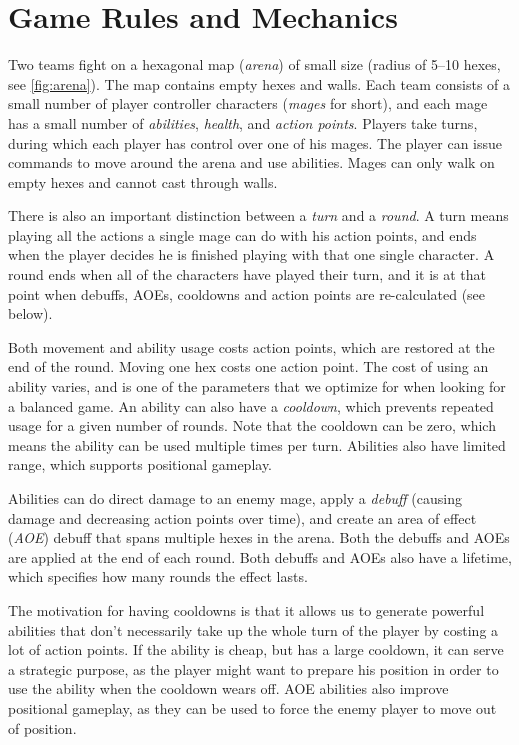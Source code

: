 \chapter{Game Rules and Mechanics}
\label{chapter02}

Two teams fight on a hexagonal map (\emph{arena}) of small size (radius of
5--10 hexes, see \autoref{fig:arena}). The map contains empty hexes and walls.
Each team consists of a small number of player controller
characters (\emph{mages} for short), and each mage has a small number of
\emph{abilities}, \emph{health}, and \emph{action points}. Players take turns, during
which each player has control over one of his mages. The player can issue
commands to move around the arena and use abilities. Mages can only walk on empty hexes
and cannot cast through walls.

There is also an important distinction between a \emph{turn} and a \emph{round}.
A turn means playing all the actions a single mage can do with his action points,
and ends when the player decides he is finished playing with that one single character.
A round ends when all of the characters have played their turn, and it is at that point
when debuffs, AOEs, cooldowns and action points are re-calculated (see below).

Both movement and ability usage costs action points, which are restored at the
end of the round. Moving one hex costs one action point. The cost of using an
ability varies, and is one of the parameters that we optimize for when looking
for a balanced game. An ability can also have a \emph{cooldown}, which
prevents repeated usage for a given number of rounds. Note that the cooldown
can be zero, which means the ability can be used multiple times per turn.
Abilities also have limited range, which supports positional gameplay.

Abilities can do direct damage to an enemy mage, apply a \emph{debuff} (causing
damage and decreasing action points over time), and create an area of effect
(\emph{AOE}) debuff that spans multiple hexes in the arena. Both the debuffs and
AOEs are applied at the end of each round. Both debuffs and AOEs also have a lifetime,
which specifies how many rounds the effect lasts.

The motivation for having cooldowns is that it allows us to generate powerful
abilities that don't necessarily take up the whole turn of the player by costing
a lot of action points. If the ability is cheap, but has a large cooldown, it can
serve a strategic purpose, as the player might want to prepare his position in order
to use the ability when the cooldown wears off. AOE abilities also improve positional
gameplay, as they can be used to force the enemy player to move out of position.

